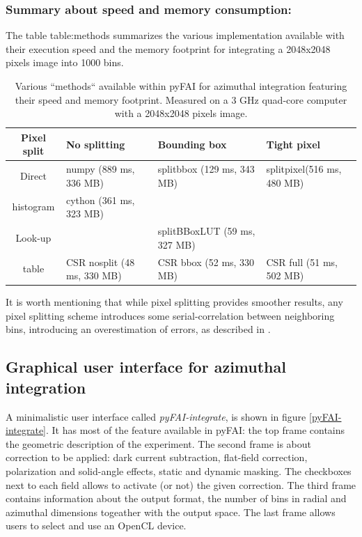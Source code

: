 \documentclass[preprint]{iucr}
\begin{document}
\subsubsection{Summary about speed and memory consumption:}

The table {table:methods}  summarizes the various implementation available
with their execution speed and the memory footprint for integrating a 2048x2048
pixels image into 1000 bins.

\begin{table}
\caption{Various ``methods`` available within pyFAI for azimuthal integration
featuring their speed and memory footprint. Measured on a 3 GHz quad-core
computer with a 2048x2048 pixels image.}
\begin{tabular}[pos]{|c|l|l|l|}
\hline
Pixel split& No splitting & Bounding box & Tight pixel \\
\hline
Direct    & numpy (889 ms, 336 MB) & splitbbox (129 ms, 343 MB) &
splitpixel(516 ms, 480 MB)\\
histogram & cython (361 ms, 323 MB) &                       &                \\
\hline
Look-up   &       & splitBBoxLUT (59 ms, 327 MB) &    \\
table     & CSR nosplit (48 ms, 330 MB)       & CSR bbox (52 ms, 330
MB) & CSR full (51 ms, 502 MB)\\
\hline
\end{tabular}
\label{table:methods}
\end{table}

It is worth mentioning that while pixel splitting provides smoother results, any
pixel splitting scheme introduces some serial-correlation between
neighboring bins, introducing an overestimation of errors, as described in \cite{billinge2014}.

\subsection{Graphical user interface for azimuthal integration}

A minimalistic user interface called \textit{pyFAI-integrate}, is
shown in figure \ref{pyFAI-integrate}.
It has most of the feature available in pyFAI:
the top frame contains the geometric description of the experiment.
The second frame is about correction to be applied: dark current subtraction,
flat-field correction, polarization and solid-angle effects, static and dynamic
masking. The checkboxes next to each field allows to activate (or not) the given
correction.
The third frame contains information about the output format, the number of bins
in radial and azimuthal dimensions togeather with the output space.
The last frame allows users to select and use an OpenCL device.
\end{document}
